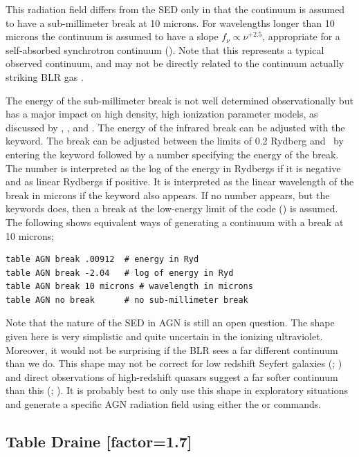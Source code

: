 This radiation field differs from the \citet{Mathews1987} SED
only in that the continuum is assumed to have a sub-millimeter break at
10 microns.
For wavelengths longer than 10 microns the continuum is assumed
to have a slope $f_\nu\propto \nu^{+2.5}$,
appropriate for a self-absorbed synchrotron
continuum (\citealp{Rybicki1979}).
Note that this represents a typical
observed continuum,
and may not be directly related to the continuum actually
striking BLR gas \citep{KoristaFerlandBaldwin1997}.

The energy of the sub-millimeter break is not well determined
observationally but has a major impact on high density, high ionization
parameter models, as discussed by \citet{Ferland1989}, \citet{FerlandPeterson1992}, and \citet{Ferland1999a}.  The energy of the infrared break can be
adjusted with the  keyword.
The break can be adjusted between the
limits of 0.2 Rydberg and \emm\
by entering the keyword 
followed by a number specifying the energy of the break.  The number is
interpreted as the log of the energy in Rydbergs if it is negative and as
linear Rydbergs if positive.  It is interpreted as the linear wavelength
of the break in microns if the keyword \cdCommand{microns} also appears.
If no number appears, but the keywords \cdCommand{no break} does,
then a break at the low-energy
limit of the code (\emm ) is assumed.
The following shows
equivalent ways of generating a continuum with a break at 10 microns;
\begin{verbatim}
table AGN break .00912  # energy in Ryd
table AGN break -2.04   # log of energy in Ryd
table AGN break 10 microns # wavelength in microns
table AGN no break      # no sub-millimeter break
\end{verbatim}
Note that the nature of the SED in AGN is still an open question.  The
shape given here is very simplistic and quite uncertain in the
ionizing ultraviolet.  Moreover, it would not be surprising if the BLR
sees a far different continuum than we do.  This shape may not be
correct for low redshift Seyfert galaxies (\citealp{Binette1989};
\citealp{Clavel1990}) and direct observations of high-redshift quasars
suggest a far softer continuum than this (\citealp{Zheng1997};
\citealp{KoristaFerlandBaldwin1997}).
It is
probably best to only use this shape in exploratory situations and
generate a specific AGN radiation field using either the
 or  commands.

\subsection{Table Draine [factor=1.7]}

